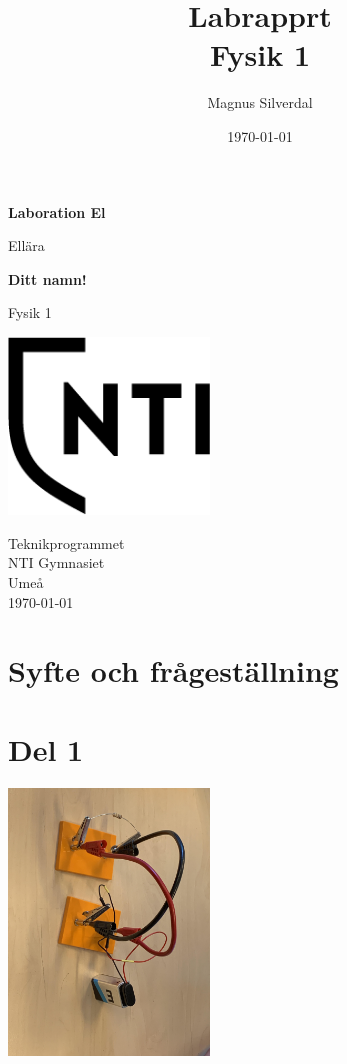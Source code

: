 \documentclass[11p]{article}
\title{Labrapprt \\ \small Fysik 1}
\author{Magnus Silverdal }
\date{\today}
\begin{document}
    \begin{titlepage}
        \begin{center}
            \vspace*{1cm}

            \Huge
            \textbf{Laboration El}

            \vspace{0.5cm}
            \LARGE
            Ellära

            \vspace{1.5cm}

            \textbf{Ditt namn!}

            \vfill


            Fysik 1

            \vspace{0.8cm}

            \includegraphics[width=0.4\textwidth]{../images/NTI Gymnasiet_Symbol_print_svart.png}

            \Large
            Teknikprogrammet\\
            NTI Gymnasiet\\
            Umeå\\
            \today

        \end{center}
    \end{titlepage}
    \section{Syfte och frågeställning}
    \section{Del 1}
    \includegraphics[width=0.4\textwidth]{../images/Elbild.jpg}
\end{document}
